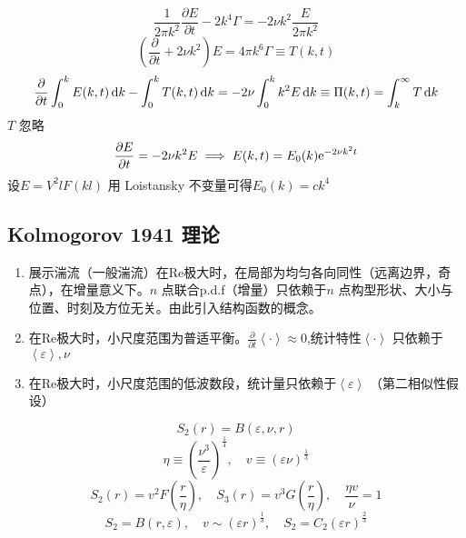 \documentclass[12pt]{ctexart}
\begin{document}
\begin{equation}
   \frac{1}{2\pi k^2} \frac{\partial E}{\partial t}  - 2k^4 \Gamma = -2 \nu k^2 \frac{E}{2\pi k^2}
\end{equation}
\begin{equation}
   \left( \frac{\partial }{\partial t} + 2\nu k^2 \right) E = 4\pi k^6 \Gamma \equiv T(k,t) 
\end{equation}
\begin{equation}
   \frac{\partial }{\partial t} \int_0^k E(k,t) \dif k - \int_0^k T(k,t)\dif k = -2 \nu \int_0^k k^2 E \dif k \equiv \Pi(k,t) = \int_k^{\infty} T \dif k
\end{equation}
$T$ 忽略
\begin{equation}
   \frac{\partial E}{\partial t} = -2 \nu k^2 E \implies E(k,t) = E_0(k) \mathrm{e}^{-2\nu k^2t}
\end{equation}
设$E = V^2 l F(kl)$ 用 Loistansky 不变量可得$ E_0(k) = ck^4$

\subsection{Kolmogorov 1941 理论}

\begin{enumerate}
   \item 展示湍流（一般湍流）在Re极大时，在局部为均匀各向同性（远离边界，奇点），在增量意义下。$n$ 点联合p.d.f（增量）只依赖于$n$ 点构型形状、大小与位置、时刻及方位无关。由此引入结构函数的概念。
   \item 在Re极大时，小尺度范围为普适平衡。$ \frac{\partial }{\partial t} \left<\cdot \right> \approx 0$,统计特性$\left<\cdot \right>$ 只依赖于$\left<\varepsilon\right>,\nu$
   \item 在Re极大时，小尺度范围的低波数段，统计量只依赖于$\left<\varepsilon \right>$ （第二相似性假设）
\end{enumerate}
\begin{equation}
   S_2(r) = B(\varepsilon, \nu, r)
\end{equation}
\begin{equation}
   \eta \equiv \left( \frac{\nu^3}{\varepsilon} \right) ^{\frac{1}{4}},\quad v \equiv (\varepsilon \nu)^{\frac{1}{3}}
\end{equation}
\begin{equation}
   S_2(r) = v^2 F \left( \frac{r}{\eta} \right),\quad S_3(r) = v^3 G(\frac{r}{\eta}),\quad \frac{\eta v}{\nu} = 1
\end{equation}
\begin{equation}
   S_2 = B(r,\varepsilon),\quad v \sim (\varepsilon r)^{\frac{1}{3}},\quad S_2 = C_2 (\varepsilon r)^{\frac{2}{3}}
\end{equation}
\end{document}
